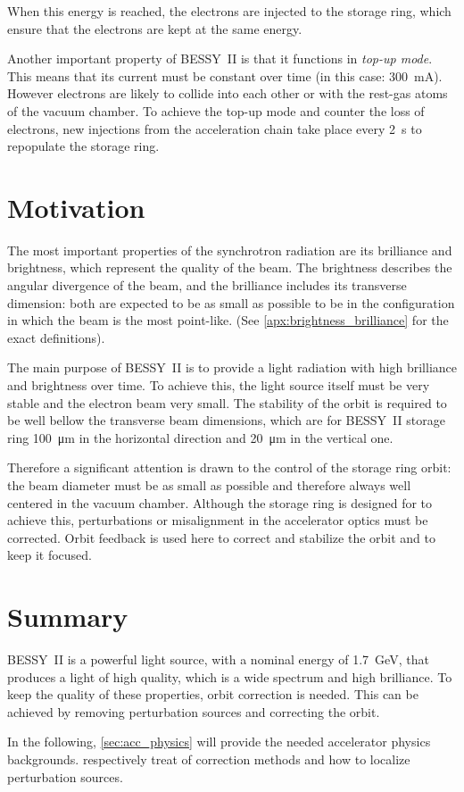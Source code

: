 When this energy is reached, the electrons are injected to the storage ring, which ensure that the electrons are kept at the same energy.

Another important property of BESSY~II is that it functions in \textit{top-up mode}. This means that its current must be constant over time (in this case: \SI{300}{\milli\ampere}). However electrons are likely to collide into each other or with the rest-gas atoms of the vacuum chamber. To achieve the top-up mode and counter the loss of electrons, new injections from the acceleration chain take place every 2~s to repopulate the storage ring.

\section{Motivation}
The most important properties of the synchrotron radiation are its brilliance and brightness, which represent the quality of the beam. The brightness describes the angular divergence of the beam, and the brilliance includes its transverse dimension: both are expected to be as small as possible to be in the configuration in which the beam is the most point-like. (See \cref{apx:brightness_brilliance} for the exact definitions).

The main purpose of BESSY~II is to provide a light radiation with high brilliance and brightness over time. To achieve this, the light source itself must be very stable and the electron beam very small. The stability of the orbit is required to be well bellow the transverse beam dimensions, which are for BESSY~II storage ring \SI{100}{\micro\meter} in the horizontal direction and \SI{20}{\micro\meter} in the vertical one.

Therefore a significant attention is drawn to the control of the storage ring orbit: the beam diameter must be as small as possible and therefore always well centered in the vacuum chamber. Although the storage ring is designed for to achieve this, perturbations or misalignment in the accelerator optics must be corrected. Orbit feedback is used here to correct and stabilize the orbit and to keep it focused.

\section{Summary}
BESSY~II is a powerful light source, with a nominal energy of \SI{1.7}{\giga\electronvolt}, that produces a light of high quality, which is a wide spectrum and high brilliance. To keep the quality of these properties, orbit correction is needed. This can be achieved by removing perturbation sources and correcting the orbit.

In the following, \cref{sec:acc_physics} will provide the needed accelerator physics backgrounds.  respectively treat of correction methods and how to localize perturbation sources.
